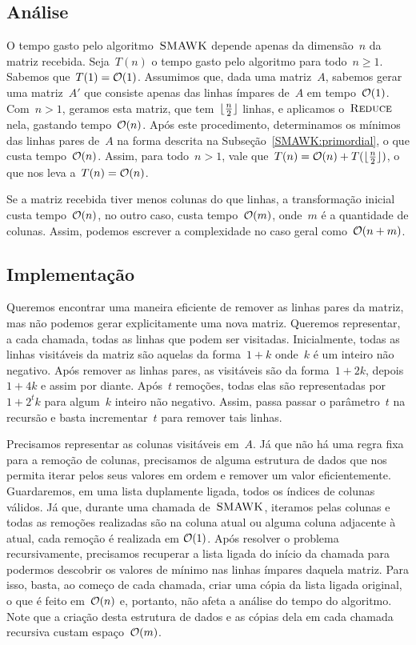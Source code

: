 \subsection{Análise}
O tempo gasto pelo algoritmo~$\textsc{SMAWK}$ depende apenas da dimensão~$n$ da matriz recebida. Seja~$T(n)$ o tempo gasto pelo algoritmo para todo~$n \geq 1$. Sabemos que~$T(1) = \mathcal{O}(1)$. Assumimos que, dada uma matriz~$A$, sabemos gerar uma matriz~$A'$ que consiste apenas das linhas ímpares de~$A$ em tempo~$\mathcal{O}(1)$. Com~$n > 1$, geramos esta matriz, que tem~$\lfloor\frac{n}{2}\rfloor$ linhas, e aplicamos o~$\textsc{Reduce}$ nela, gastando tempo~$\mathcal{O}(n)$. Após este procedimento, determinamos os mínimos das linhas pares de~$A$ na forma descrita na Subseção~\ref{SMAWK:primordial}, o que custa tempo~$\mathcal{O}(n)$. Assim, para todo~${ n > 1 }$, vale que~${ T(n) = \mathcal{O}(n) + T(\lfloor\frac{n}{2}\rfloor) }$, o que nos leva a~${ T(n) = \mathcal{O}(n) }$.

Se a matriz recebida tiver menos colunas do que linhas, a transformação inicial custa tempo~$\mathcal{O}(n)$, no outro caso, custa tempo~$\mathcal{O}(m)$, onde~$m$ é a quantidade de colunas. Assim, podemos escrever a complexidade no caso geral como~$\mathcal{O}(n+m)$.


\subsection{Implementação}
Queremos encontrar uma maneira eficiente de remover as linhas pares da matriz, mas não podemos gerar explicitamente uma nova matriz. Queremos representar, a cada chamada, todas as linhas que podem ser visitadas. Inicialmente, todas as linhas visitáveis da matriz são aquelas da forma~${ 1 + k }$ onde~$k$ é um inteiro não negativo. Após remover as linhas pares, as visitáveis são da forma~${ 1 + 2k }$, depois~${ 1 + 4k }$ e assim por diante. Após~$t$ remoções, todas elas são representadas por~${ 1 + 2^tk }$ para algum~$k$ inteiro não negativo. Assim, passa passar o parâmetro~$t$ na recursão e basta incrementar~$t$ para remover tais linhas.

Precisamos representar as colunas visitáveis em~$A$. Já que não há uma regra fixa para a remoção de colunas, precisamos de alguma estrutura de dados que nos permita iterar pelos seus valores em ordem e remover um valor eficientemente. Guardaremos, em uma lista duplamente ligada, todos os índices de colunas válidos. Já que, durante uma chamada de~$\textsc{SMAWK}$, iteramos pelas colunas e todas as remoções realizadas são na coluna atual ou alguma coluna adjacente à atual, cada remoção é realizada em $\mathcal{O}(1)$. Após resolver o problema recursivamente, precisamos recuperar a lista ligada do início da chamada para podermos descobrir os valores de mínimo nas linhas ímpares daquela matriz. Para isso, basta, ao começo de cada chamada, criar uma cópia da lista ligada original, o que é feito em~$\mathcal{O}(n)$ e, portanto, não afeta a análise do tempo do algoritmo. Note que a criação desta estrutura de dados e as cópias dela em cada chamada recursiva custam espaço~$\mathcal{O}(m)$.

